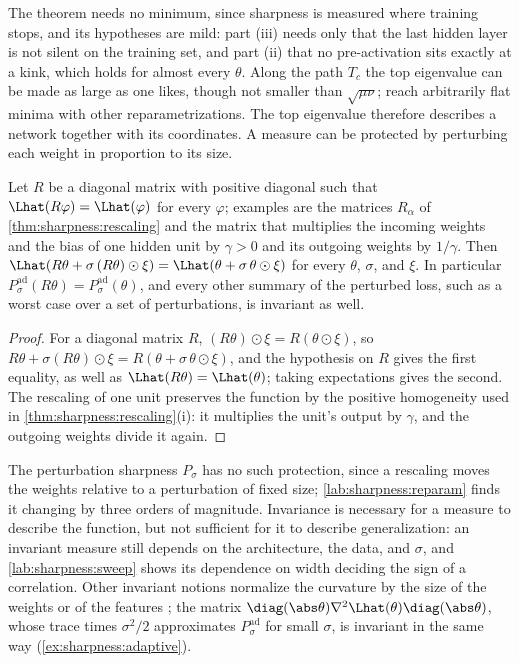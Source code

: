 \begin{refsection}
The theorem needs no minimum, since sharpness is measured where training stops, and its hypotheses are mild: part (iii) needs only that the last hidden layer is not silent on the training set, and part (ii) that no pre-activation sits exactly at a kink, which holds for almost every $\theta$. Along the path $T_c$ the top eigenvalue can be made as large as one likes, though not smaller than $\sqrt{\mu\nu}$; \textcite{DinhEtAl2017} reach arbitrarily flat minima with other reparametrizations. The top eigenvalue therefore describes a network together with its coordinates. A measure can be protected by perturbing each weight in proportion to its size.

\begin{proposition}\label{prop:sharpness:invariant}
Let $R$ be a diagonal matrix with positive diagonal such that $\Lhat(R\varphi)=\Lhat(\varphi)$ for every $\varphi$; examples are the matrices $R_\alpha$ of \cref{thm:sharpness:rescaling} and the matrix that multiplies the incoming weights and the bias of one hidden unit by $\gamma>0$ and its outgoing weights by $1/\gamma$. Then $\Lhat(R\theta+\sigma\,(R\theta)\odot\xi)=\Lhat(\theta+\sigma\,\theta\odot\xi)$ for every $\theta$, $\sigma$, and $\xi$. In particular $P^{\mathrm{ad}}_\sigma(R\theta)=P^{\mathrm{ad}}_\sigma(\theta)$, and every other summary of the perturbed loss, such as a worst case over a set of perturbations, is invariant as well.
\end{proposition}

\begin{proof}
For a diagonal matrix $R$, $(R\theta)\odot\xi=R(\theta\odot\xi)$, so $R\theta+\sigma(R\theta)\odot\xi=R(\theta+\sigma\,\theta\odot\xi)$, and the hypothesis on $R$ gives the first equality, as well as $\Lhat(R\theta)=\Lhat(\theta)$; taking expectations gives the second. The rescaling of one unit preserves the function by the positive homogeneity used in \cref{thm:sharpness:rescaling}(i): it multiplies the unit's output by $\gamma$, and the outgoing weights divide it again.
\end{proof}

The perturbation sharpness $P_\sigma$ has no such protection, since a rescaling moves the weights relative to a perturbation of fixed size; \cref{lab:sharpness:reparam} finds it changing by three orders of magnitude. Invariance is necessary for a measure to describe the function, but not sufficient for it to describe generalization: an invariant measure still depends on the architecture, the data, and $\sigma$, and \cref{lab:sharpness:sweep} shows its dependence on width deciding the sign of a correlation. Other invariant notions normalize the curvature by the size of the weights or of the features \parencite{TsuzukuSatoSugiyama2020,PetzkaEtAl2021}; the matrix $\diag(\abs\theta)\nabla^2\Lhat(\theta)\diag(\abs\theta)$, whose trace times $\sigma^2/2$ approximates $P^{\mathrm{ad}}_\sigma$ for small $\sigma$, is invariant in the same way (\cref{ex:sharpness:adaptive}).


\end{refsection}
